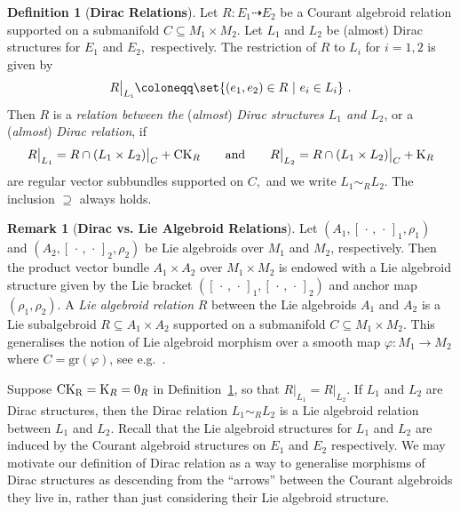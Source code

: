 \documentclass[a4paper, reqno, 11pt]{amsart}
\numberwithin{equation}{section}
\theoremstyle{definition}
\newtheorem{definition}[equation]{Definition}
\newtheorem{remark}[equation]{Remark}
\newcommand{\gr}{\text{gr}}
\theoremstyle{remark}
\begin{document}
\begin{definition}[\textbf{Dirac Relations}] \label{def:Diracrel}
Let $R \colon E_1 \dashrightarrow E_2$ be a Courant algebroid relation supported on a submanifold $C \subseteq M_1 \times M_2$. Let $L_1$ and $L_2$ be (almost) Dirac structures for $E_1$ and $E_2,$ respectively. The restriction of $R$ to $L_i$ for $i=1,2$ is given by
\begin{align}
R \big\rvert_{L_i} \coloneqq \set{(e_1, e_2) \in R \ \vert \ e_i \in L_i} \ .   
\end{align}
Then $R$ is a \emph{relation between the} (\emph{almost}) \emph{Dirac structures $L_1$ and $L_2$}, or a (\emph{almost}) \emph{Dirac relation}, if
\begin{align}
R \big\rvert_{L_1} = R\cap (L_1 \times L_2) \big\rvert_C + {\rm CK}_R  \qquad \text{and} \qquad  R \big\rvert_{L_2} = R\cap (L_1 \times L_2) \big\rvert_C + {\rm K}_R  
\end{align}
are regular vector subbundles supported on $C,$ and we write $L_1\sim_R L_2$. The inclusion $\supseteq$ always holds.
\end{definition}

\begin{remark}[\textbf{Dirac vs. Lie Algebroid Relations}] \label{rmk:DiracLieAlgebroid}
     Let $(A_1 , [\, \cdot \, ,\, \cdot \,]_1, \rho_1)$ and $(A_2 , [\, \cdot \, ,\, \cdot \,]_2, \rho_2)$ be Lie algebroids over $M_1$ and $M_2 $, respectively. Then the product vector  bundle $A_1 \times A_2$ over $M_1 \times M_2$ is endowed with a Lie algebroid structure given by the Lie bracket $([\, \cdot \, ,\, \cdot \,]_1,[\, \cdot \, ,\, \cdot \,]_2 )$ and anchor map $(\rho_1, \rho_2).$
     A \emph{Lie algebroid relation} $R$ between the Lie algebroids $A_1$ and $A_2$ is a Lie subalgebroid $R \subseteq A_1 \times A_2$ supported on a submanifold $C \subseteq M_1 \times M_2$. This generalises the notion of Lie algebroid morphism over a smooth map $\varphi:M_1\to M_2$ where $C=\gr(\varphi)$, see e.g.~\cite[Section~2.3]{Meinrenken}. 
    
     Suppose ${\rm CK_R} = {\rm K}_R = {0_R}$ in Definition~\ref{def:Diracrel}, so that $R \rvert_{L_1} = R\rvert_{L_2}$. If $L_1$ and $L_2$ are Dirac structures, then the Dirac relation $L_1 \sim_R L_2$ is a Lie algebroid relation between $L_1$ and $L_2$. Recall that the Lie algebroid structures for $L_1$ and $L_2$ are induced by the Courant algebroid structures on $E_1$ and $E_2$ respectively. We may motivate our definition of Dirac relation as a way to generalise morphisms of Dirac structures as descending from the ``arrows'' between the Courant algebroids they live in, rather than just considering their Lie algebroid structure.
\end{remark}
\end{document}
